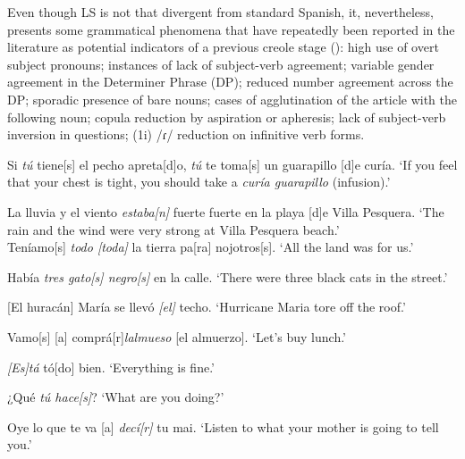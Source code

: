 \documentclass[output=paper,colorlinks,citecolor=brown]{langscibook}
\begin{document}
Even though LS is not that divergent from standard Spanish, it, nevertheless, presents some grammatical phenomena that have repeatedly been reported in the literature as potential indicators of  a previous creole stage (\citealt{Grandade1968,Otheguy1973,alvarez_obediente1998}):  high use of overt subject pronouns;  instances of lack of subject-verb agreement;  variable gender agreement in the Determiner Phrase (DP);  reduced number agreement across the DP;  sporadic presence of bare nouns;  cases of agglutination of the article with the following noun;  copula reduction by aspiration or apheresis;  lack of subject-verb inversion in questions; (1i) /ɾ/ reduction on infinitive verb forms.

\ea \label{ex:visconte:1}
\ea \label{ex:visconte:1a}
{Si} \textit{{tú}} {tiene[s] el pecho apreta[d]o,} \textit{{tú}} {te toma[s] un   guarapillo [d]e curía.}
\glt `If you feel that your chest is tight, you should take a \textit{curía   guarapillo} (infusion).’

\ex \label{ex:visconte:1b} 
{La lluvia y el viento} \textit{{estaba[n]}} {fuerte fuerte en la playa [d]e   Villa Pesquera.}
\glt `The rain and the wind were very strong at Villa Pesquera   beach.’\\

\ex \label{ex:visconte:1c}
{Teníamo[s]} \textit{{todo} \textit{[toda]}} {la tierra pa[ra] nojotros[s].}
\glt `All the land was for us.’

\ex \label{ex:visconte:1d}
{Había} \textit{{tres} \textit{gato[s]} \textit{negro[s]}} {en la calle.}
\glt `There were three black cats in the street.’

\ex \label{ex:visconte:1e}
{[El huracán] María se llevó} \textit{{[el]}} {techo.}
\glt `Hurricane Maria tore off the roof.’

\ex \label{ex:visconte:1f}
{Vamo[s] [a] comprá[r]}\textit{{lalmueso}} {[el almuerzo].}
\glt `Let's buy lunch.’

\ex \label{ex:visconte:1g}  
\textit{{[Es]tá}} {tó[do] bien}.
\glt `Everything is fine.’

\ex \label{ex:visconte:1h}
{¿Qué} \textit{{tú} \textit{hace[s]}}?
\glt `What are you doing?’

\ex \label{ex:visconte:1i}
{Oye lo que te va [a]} \textit{{decí[r]}} {tu mai.}
\glt `Listen to what your mother is going to tell you.’
\z
\z
\end{document}

